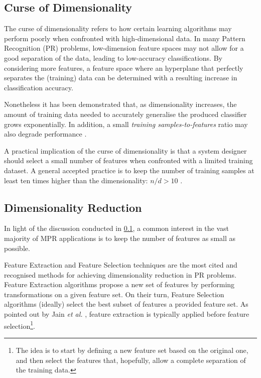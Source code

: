 \documentclass[9pt,journal,compsoc]{IEEEtran}
\begin{document}
\subsection{Curse of Dimensionality}
\label{curse_dimensionality}

The curse of dimensionality refers to how certain learning algorithms may perform poorly when confronted with high-dimensional data. In many Pattern Recognition (PR) problems, low-dimension feature spaces may not allow for a good separation of the data, leading to low-accuracy classifications. By considering more features, a feature space where an hyperplane that perfectly separates the (training) data can be determined with a resulting increase in classification accuracy.

Nonetheless it has been demonstrated that, as dimensionality increases, the amount of training data needed to accurately generalise the produced classifier grows exponentially. In addition, a small \emph{training samples-to-features} ratio may also degrade performance \cite{jain2000statistical}.

A practical implication of the curse of dimensionality is that a system designer should select a small number of features when confronted with a limited training dataset. A general accepted practice is to keep the number of training samples at least ten times higher than the dimensionality: $n / d > 10$ \cite{jain2000statistical}.

\subsection{Dimensionality Reduction}

In light of the discussion conducted in \ref{curse_dimensionality}, a common interest in the vast majority of MPR applications is to keep the number of features as small as possible.

Feature Extraction and Feature Selection techniques are the most cited and recognised methods for achieving dimensionality reduction in PR problems. Feature Extraction algorithms propose a new set of features by performing transformations on a given feature set. On their turn, Feature Selection algorithms (ideally) select the best subset of features a provided feature set. As pointed out by Jain \emph{et al.} \cite{jain2000statistical}, feature extraction is typically applied before feature selection\footnote{The idea is to start by defining a new feature set based on the original one, and then select the features that, hopefully, allow a complete separation of the training data.}.
\end{document}

